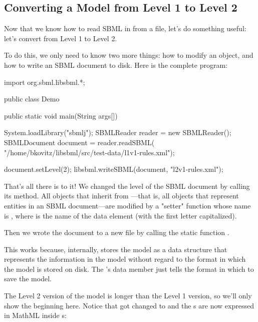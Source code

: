 \documentclass{sbmlmanual}
\begin{document}
\subsection{Converting a Model from Level 1 to Level 2}
\label{sec:simple-java-program}

Now that we know how to read SBML in from a file, let's do
something useful: let's convert  from Level 1
to Level 2.

To do this, we only need to know two more things: how to
modify an  object, and how to write an SBML document to
disk.  Here is the complete program:

\begin{boxedCodeVerbatim}
   import org.sbml.libsbml.*;

   public class Demo
   {
      public static void main(String args[])
      {
         System.loadLibrary("sbmlj");
         SBMLReader reader   = new SBMLReader();
         SBMLDocument document = reader.readSBML(
            "/home/bkovitz/libsbml/src/test-data/l1v1-rules.xml");

         document.setLevel(2);
         libsbml.writeSBML(document, "l2v1-rules.xml");
      }
   }
\end{boxedCodeVerbatim}

That's all there is to it!  We changed the level of the SBML
document by calling its  method.  All \libsbml{}
objects that inherit from ---that is, all \libsbml{} objects
that represent entities in an SBML document---are modified by
a "setter" function whose name is , where  is
the name of the data element (with the first letter
capitalized).

Then we wrote the document to a new file by calling the
static function .

This works because, internally, \libsbml{} stores the model as a
data structure that represents the information in the model
without regard to the format in which the model is stored on
disk.  The 's  data member just tells
 the format in which to save the model.

The Level 2 version of the model is longer than the Level 1
version, so we'll only show the beginning here.  Notice that
 got changed to  and the s are
now expressed in MathML inside s:
\end{document}
